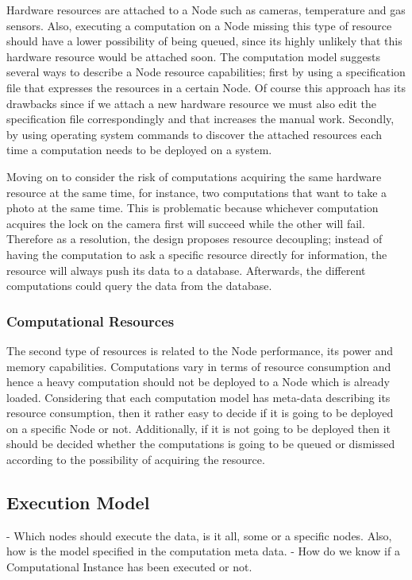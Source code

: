   Hardware resources  are attached to a Node such as cameras, temperature and gas sensors.  Also, executing a computation on a Node missing this type of resource should have a lower possibility of being queued, since its highly unlikely that this hardware resource would be attached soon. The computation model suggests several ways to describe a Node resource capabilities; first by using a specification file that expresses the resources in a certain Node. Of course this approach has its drawbacks since if we attach a new hardware resource we must also edit the specification file correspondingly and that increases the manual work. Secondly, by using operating system commands to discover the attached resources each time a computation needs to be deployed on a system. 
  
  Moving on to consider the risk of computations acquiring the same hardware resource at the same time, for instance, two computations that want to take a photo at the same time. This is problematic because whichever computation acquires the lock on the camera first will succeed while the other will fail. Therefore as a resolution, the design proposes resource decoupling; instead of having the computation to ask a specific resource directly for information, the resource will always push its data to a database. Afterwards, the different computations could query the data from the database.
  

\subsubsection{Computational Resources }
The second type of resources is related to the Node performance, its power and memory capabilities. Computations vary in terms of resource consumption and hence a heavy computation should not be deployed to a Node which is already loaded. Considering that each computation model has meta-data describing its resource consumption, then it rather easy to decide if it is going to be deployed on a specific Node or not. Additionally, if it is not going to be deployed then it should be decided whether the computations is going to be queued or dismissed according to the possibility of acquiring the resource.




\iffalse \subsection{Execution Model}
- Which nodes should execute the data, is it all, some  or a specific nodes. Also, how is the model specified in the computation meta data.
- How do we know if a Computational Instance has been executed or not.

